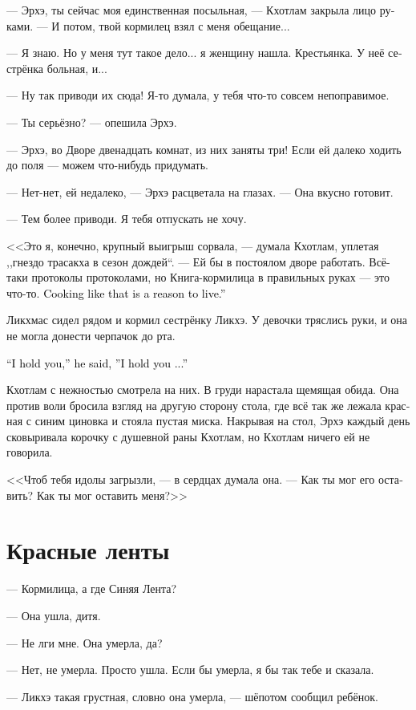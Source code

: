 \documentclass[a4paper,12pt,fleqn]{book}\usepackage{cooltooltips}\usepackage{polyglossia}\setdefaultlanguage{russian}\setotherlanguage{english}\defaultfontfeatures{Ligatures=TeX,Mapping=tex-text} \usepackage{xcolor}\definecolor{lightgray}{HTML}{bbbbbb}\color{lightgray}\newcommand{\ml}[3]{\textenglish{\textcolor{black}{#3}}}
\begin{document}
--- Эрхэ, ты сейчас моя единственная посыльная, --- Кхотлам закрыла лицо руками.
--- И потом, твой кормилец взял с меня обещание...

--- Я знаю.
Но у меня тут такое дело... я женщину нашла.
Крестьянка.
У неё сестрёнка больная, и...

--- Ну так приводи их сюда!
Я-то думала, у тебя что-то совсем непоправимое.

--- Ты серьёзно? --- опешила Эрхэ.

--- Эрхэ, во Дворе двенадцать комнат, из них заняты три!
Если ей далеко ходить до поля --- можем что-нибудь придумать.

--- Нет-нет, ей недалеко, --- Эрхэ расцветала на глазах.
--- Она вкусно готовит.

--- Тем более приводи.
Я тебя отпускать не хочу.

<<Это я, конечно, крупный выигрыш сорвала, --- думала Кхотлам, уплетая ,,гнездо трасакха в сезон дождей``.
--- Ей бы в постоялом дворе работать.
Всё-таки протоколы протоколами, но Книга-кормилица в правильных руках --- это что-то.
\ml{$0$}
{От такой стряпни жить хочется>>.}
{Cooking like that is a reason to live.''}

Ликхмас сидел рядом и кормил сестрёнку Ликхэ.
У девочки тряслись руки, и она не могла донести черпачок до рта.

\ml{$0$}
{--- Я держу, --- говорил он, --- я держу...}
{``I hold you,'' he said, ''I hold you ...''}

Кхотлам с нежностью смотрела на них.
В груди нарастала щемящая обида.
Она против воли бросила взгляд на другую сторону стола, где всё так же лежала красная с синим циновка и стояла пустая миска.
Накрывая на стол, Эрхэ каждый день сковыривала корочку с душевной раны Кхотлам, но Кхотлам ничего ей не говорила.

<<Чтоб тебя идолы загрызли, --- в сердцах думала она.
--- Как ты мог его оставить?
Как ты мог оставить меня?>>

\section{Красные ленты}

--- Кормилица, а где Синяя Лента?

--- Она ушла, дитя.

--- Не лги мне.
Она умерла, да?

--- Нет, не умерла.
Просто ушла.
Если бы умерла, я бы так тебе и сказала.

--- Ликхэ такая грустная, словно она умерла, --- шёпотом сообщил ребёнок.
\end{document}
